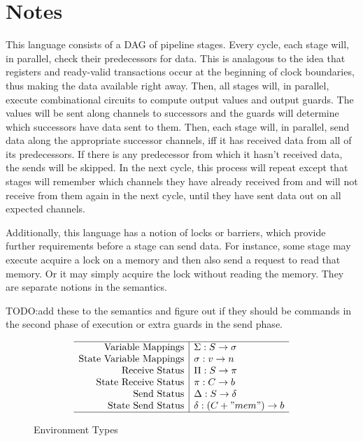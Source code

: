 \documentclass{article}
\begin{document}
\section{Notes}

This language consists of a DAG of pipeline stages.
Every cycle, each stage will, in parallel, check their
predecessors for data. This is analagous to the idea
that registers and ready-valid transactions occur at the beginning
of clock boundaries, thus making the data available right away.
Then, all stages will, in parallel, execute combinational circuits
to compute output values and output guards. The values will
be sent along channels to successors and the guards will determine
which successors have data sent to them.
Then, each stage will, in parallel, send data along
the appropriate successor channels, iff it has received
data from all of its predecessors. If there is any predecessor
from which it hasn't received data, the sends will be skipped.
In the next cycle, this process will repeat except that stages
will remember which channels they have already received from and
will not receive from them again in the next cycle, until they
have sent data out on all expected channels.

Additionally, this language has a notion of locks or barriers,
which provide further requirements before a stage can send data.
For instance, some stage may execute acquire a lock
on a memory and then also send a request to read that memory.
Or it may simply acquire the lock without reading the memory.
They are separate notions in the semantics.

TODO:add these to the semantics and figure out if they should
be commands in the second phase of execution or extra guards in the send phase.

\begin{figure}
  \[\begin{array}{r|l} \hline
    \text{Variable Mappings} & \Sigma: S \rightarrow \sigma \\
    \text{State Variable Mappings} & \sigma: v \rightarrow n \\
    \text{Receive Status} & \Pi: S \rightarrow \pi \\
    \text{State Receive Status} & \pi: C \rightarrow b \\
    \text{Send Status} & \Delta: S \rightarrow \delta \\
    \text{State Send Status} & \delta: (C + "mem") \rightarrow b \\ \hline
  \end{array}\]
  \caption{Environment Types}
\end{figure}
\end{document}
